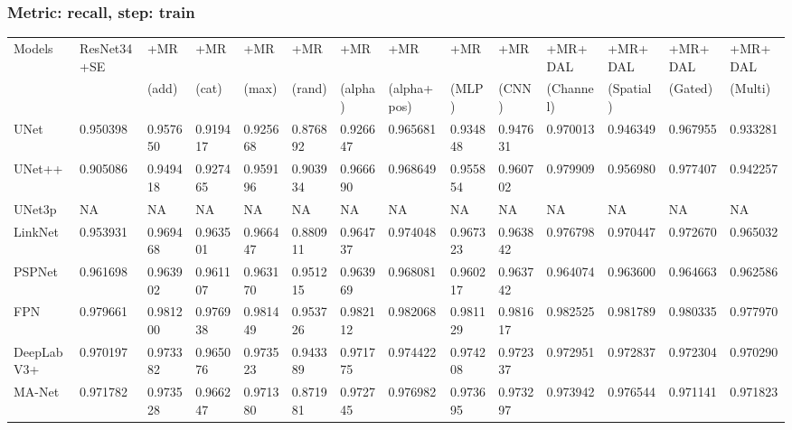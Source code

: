 \documentclass{article}
\begin{document}
\subsubsection{Metric: recall, step: train}
\begin{tabular}{llllllllllllll}
\toprule
Models & ResNet34+SE & +MR  & +MR  & +MR  & +MR  & +MR  & +MR  & +MR  & +MR  & +MR+DAL & +MR+DAL & +MR+DAL & +MR+DAL \\
       &             &  (add) &  (cat) &  (max) &  (rand) &  (alpha) &  (alpha+pos) &  (MLP) &  (CNN) & (Channel) & (Spatial) & (Gated) & (Multi) \\
\midrule
UNet & 0.950398 & 0.957650 & 0.919417 & 0.925668 & 0.876892 & 0.926647 & 0.965681 & 0.934848 & 0.947631 & 0.970013 & 0.946349 & 0.967955 & 0.933281 \\
UNet++ & 0.905086 & 0.949418 & 0.927465 & 0.959196 & 0.903934 & 0.966690 & 0.968649 & 0.955854 & 0.960702 & 0.979909 & 0.956980 & 0.977407 & 0.942257 \\
UNet3p & NA & NA & NA & NA & NA & NA & NA & NA & NA & NA & NA & NA & NA \\
LinkNet & 0.953931 & 0.969468 & 0.963501 & 0.966447 & 0.880911 & 0.964737 & 0.974048 & 0.967323 & 0.963842 & 0.976798 & 0.970447 & 0.972670 & 0.965032 \\
PSPNet & 0.961698 & 0.963902 & 0.961107 & 0.963170 & 0.951215 & 0.963969 & 0.968081 & 0.960217 & 0.963742 & 0.964074 & 0.963600 & 0.964663 & 0.962586 \\
FPN & 0.979661 & 0.981200 & 0.976938 & 0.981449 & 0.953726 & 0.982112 & 0.982068 & 0.981129 & 0.981617 & 0.982525 & 0.981789 & 0.980335 & 0.977970 \\
DeepLabV3+ & 0.970197 & 0.973382 & 0.965076 & 0.973523 & 0.943389 & 0.971775 & 0.974422 & 0.974208 & 0.972337 & 0.972951 & 0.972837 & 0.972304 & 0.970290 \\
MA-Net & 0.971782 & 0.973528 & 0.966247 & 0.971380 & 0.871981 & 0.972745 & 0.976982 & 0.973695 & 0.973297 & 0.973942 & 0.976544 & 0.971141 & 0.971823 \\
\bottomrule
\end{tabular}
\end{document}

